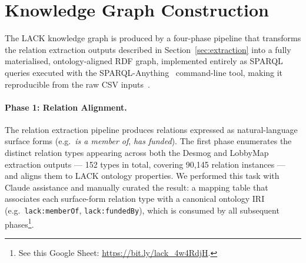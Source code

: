 \section{Knowledge Graph Construction}
\label{sec:construction}
The LACK knowledge graph is produced by a four-phase pipeline that transforms the relation extraction outputs described in Section~\ref{sec:extraction} into a fully materialised, ontology-aligned RDF graph, implemented entirely as SPARQL queries executed with the SPARQL-Anything~\cite{sparqlanything} command-line tool, making it reproducible from the raw CSV inputs~\cite{lack-kgc}.

\paragraph{Phase 1: Relation Alignment.}
\label{sec:construction:alignment}
The relation extraction pipeline produces relations expressed as natural-language surface forms (e.g.\ \emph{is a member of}, \emph{has funded}).
The first phase enumerates the distinct relation types appearing across both the Desmog and LobbyMap extraction outputs --- 152 types in total, covering 90,145 relation instances --- and aligns them to LACK ontology properties. We performed this task with Claude assistance and manually curated the result: a mapping table that associates each surface-form relation type with a canonical ontology IRI (e.g.\ \texttt{lack:memberOf}, \texttt{lack:fundedBy}), which is consumed by all subsequent phases\footnote{See this Google Sheet: \url{https://bit.ly/lack_4w4RdjH}.}.

